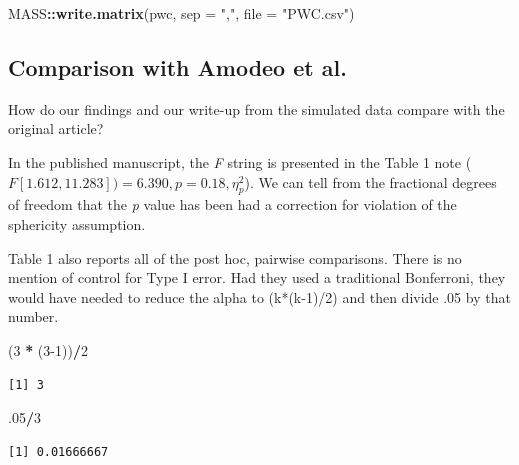 \documentclass[
  11pt,
]{book}
\newenvironment{Shaded}{\begin{snugshade}}{\end{snugshade}}
\newcommand{\AttributeTok}[1]{\textcolor[rgb]{0.27,0.27,0.27}{#1}}
\newcommand{\DecValTok}[1]{\textcolor[rgb]{0.06,0.06,0.06}{#1}}
\newcommand{\FunctionTok}[1]{\textcolor[rgb]{0.27,0.27,0.27}{\textbf{#1}}}
\newcommand{\NormalTok}[1]{#1}
\newcommand{\SpecialCharTok}[1]{\textcolor[rgb]{0.43,0.43,0.43}{\textbf{#1}}}
\newcommand{\StringTok}[1]{\textcolor[rgb]{0.5,0.5,0.5}{#1}}
\begin{document}
\begin{Shaded}
\begin{Highlighting}[]
\NormalTok{MASS}\SpecialCharTok{::}\FunctionTok{write.matrix}\NormalTok{(pwc, }\AttributeTok{sep =} \StringTok{","}\NormalTok{, }\AttributeTok{file =} \StringTok{"PWC.csv"}\NormalTok{)}
\end{Highlighting}
\end{Shaded}

\hypertarget{comparison-with-amodeo-et-al.-amodeo_empowering_2018}{%
\subsection{\texorpdfstring{Comparison with Amodeo et al.\citeyearpar{amodeo_empowering_2018}}{Comparison with Amodeo et al.{[}-@amodeo\_empowering\_2018{]}}}\label{comparison-with-amodeo-et-al.-amodeo_empowering_2018}}

How do our findings and our write-up from the simulated data compare with the original article?

In the published manuscript, the \emph{F} string is presented in the Table 1 note (\(F[1.612, 11.283]) = 6.390, p = 0.18, \eta _{p}^{2}\)). We can tell from the fractional degrees of freedom that the \emph{p} value has been had a correction for violation of the sphericity assumption.

Table 1 also reports all of the post hoc, pairwise comparisons. There is no mention of control for Type I error. Had they used a traditional Bonferroni, they would have needed to reduce the alpha to (k*(k-1)/2) and then divide .05 by that number.

\begin{Shaded}
\begin{Highlighting}[]
\NormalTok{(}\DecValTok{3} \SpecialCharTok{*}\NormalTok{ (}\DecValTok{3{-}1}\NormalTok{))}\SpecialCharTok{/}\DecValTok{2}
\end{Highlighting}
\end{Shaded}

\begin{verbatim}
[1] 3
\end{verbatim}

\begin{Shaded}
\begin{Highlighting}[]
\NormalTok{.}\DecValTok{05}\SpecialCharTok{/}\DecValTok{3}
\end{Highlighting}
\end{Shaded}

\begin{verbatim}
[1] 0.01666667
\end{verbatim}
\end{document}
